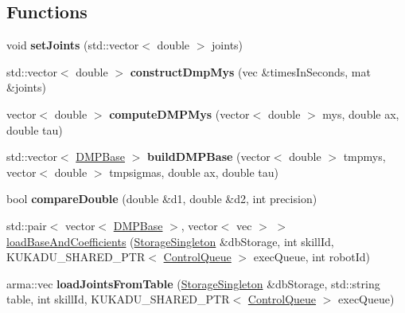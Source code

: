\subsection*{Functions}
\begin{DoxyCompactItemize}
\item 
void {\bfseries set\+Joints} (std\+::vector$<$ double $>$ joints)\hypertarget{namespacekukadu_a28ddf9b7f19de1171ac4225f889a359c}{}\label{namespacekukadu_a28ddf9b7f19de1171ac4225f889a359c}

\item 
std\+::vector$<$ double $>$ {\bfseries construct\+Dmp\+Mys} (vec \&times\+In\+Seconds, mat \&joints)\hypertarget{namespacekukadu_a37fce1aa2ed5a847b2f56ce8853de4b5}{}\label{namespacekukadu_a37fce1aa2ed5a847b2f56ce8853de4b5}

\item 
vector$<$ double $>$ {\bfseries compute\+D\+M\+P\+Mys} (vector$<$ double $>$ mys, double ax, double tau)\hypertarget{namespacekukadu_a818b7bfadd10b3b0387bd99c650da1ac}{}\label{namespacekukadu_a818b7bfadd10b3b0387bd99c650da1ac}

\item 
std\+::vector$<$ \hyperlink{classkukadu_1_1DMPBase}{D\+M\+P\+Base} $>$ {\bfseries build\+D\+M\+P\+Base} (vector$<$ double $>$ tmpmys, vector$<$ double $>$ tmpsigmas, double ax, double tau)\hypertarget{namespacekukadu_a383a9d72755140f9dcf797a99e9eb77d}{}\label{namespacekukadu_a383a9d72755140f9dcf797a99e9eb77d}

\item 
bool {\bfseries compare\+Double} (double \&d1, double \&d2, int precision)\hypertarget{namespacekukadu_aeba5d0a9ea9a72cffc0d076812ffe8b5}{}\label{namespacekukadu_aeba5d0a9ea9a72cffc0d076812ffe8b5}

\item 
std\+::pair$<$ vector$<$ \hyperlink{classkukadu_1_1DMPBase}{D\+M\+P\+Base} $>$, vector$<$ vec $>$ $>$ \hyperlink{namespacekukadu_a415d604d0d5cdaf3e6a27eb17e90ae75}{load\+Base\+And\+Coefficients} (\hyperlink{classkukadu_1_1StorageSingleton}{Storage\+Singleton} \&db\+Storage, int skill\+Id, K\+U\+K\+A\+D\+U\+\_\+\+S\+H\+A\+R\+E\+D\+\_\+\+P\+TR$<$ \hyperlink{classkukadu_1_1ControlQueue}{Control\+Queue} $>$ exec\+Queue, int robot\+Id)
\item 
arma\+::vec {\bfseries load\+Joints\+From\+Table} (\hyperlink{classkukadu_1_1StorageSingleton}{Storage\+Singleton} \&db\+Storage, std\+::string table, int skill\+Id, K\+U\+K\+A\+D\+U\+\_\+\+S\+H\+A\+R\+E\+D\+\_\+\+P\+TR$<$ \hyperlink{classkukadu_1_1ControlQueue}{Control\+Queue} $>$ exec\+Queue)\hypertarget{namespacekukadu_a4b33998271e81b551233bda624571fef}{}\label{namespacekukadu_a4b33998271e81b551233bda624571fef}


\end{DoxyCompactItemize}

